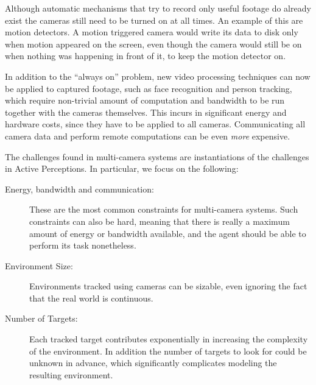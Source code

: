 Although automatic mechanisms that try to record only useful footage do already exist the cameras
still need to be turned on at all times. An example of this are motion detectors. A motion triggered
camera would write its data to disk only when motion appeared on the screen, even though the camera
would still be on when nothing was happening in front of it, to keep the motion detector on.

In addition to the ``always on'' problem, new video processing techniques can now be applied to
captured footage, such as face recognition and person tracking, which require non-trivial amount of
computation and bandwidth to be run together with the cameras themselves. This incurs in significant
energy and hardware costs, since they have to be applied to all cameras. Communicating all camera
data and perform remote computations can be even \textit{more} expensive.

The challenges found in multi-camera systems are instantiations of the challenges in Active
Perceptions. In particular, we focus on the following:

\begin{description}
\item[Energy, bandwidth and communication:] These are the most common constraints for multi-camera
    systems. Such constraints can also be hard, meaning that there is really a maximum amount of
    energy or bandwidth available, and the agent should be able to perform its task nonetheless.
\item[Environment Size:] Environments tracked using cameras can be sizable, even ignoring the fact
    that the real world is continuous.
\item[Number of Targets:] Each tracked target contributes exponentially in increasing the complexity
    of the environment. In addition the number of targets to look for could be unknown in advance,
    which significantly complicates modeling the resulting environment.
\end{description}

%
%

